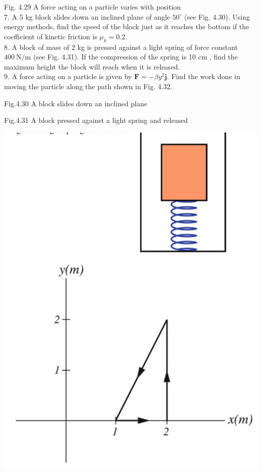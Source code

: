 \documentclass[10pt]{article}
\begin{document}
Fig. 4.29 A force acting on a particle varies with position\\
7. A 5 kg block slides down an inclined plane of angle $50^{\circ}$ (see Fig. 4.30). Using energy methods, find the speed of the block just as it reaches the bottom if the coefficient of kinetic friction is $\mu_{k}=0.2$.\\
8. A block of mass of 2 kg is pressed against a light spring of force constant $400 \mathrm{~N} / \mathrm{m}$ (see Fig. 4.31). If the compression of the spring is 10 cm , find the maximum height the block will reach when it is released.\\
9. A force acting on a particle is given by $\mathbf{F}=-\beta y^{2} \mathbf{j}$. Find the work done in moving the particle along the path shown in Fig. 4.32.

Fig.4.30 A block slides down an inclined plane

Fig.4.31 A block pressed against a light spring and released

\begin{center}
\includegraphics[max width=\textwidth]{2024_09_13_db1f357d2aad0a03eb2eg-079(1)}
\end{center}
\end{document}
